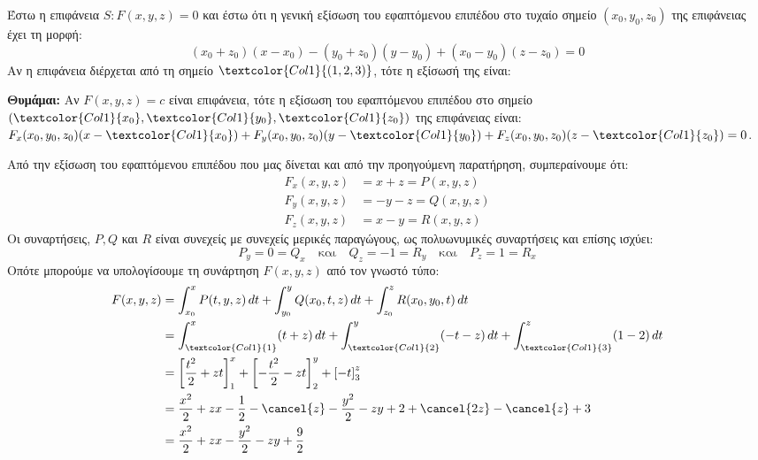 \documentclass[a4paper,table]{report}
\begin{document}
\begin{mybox3}
  \begin{thema}
    Έστω η επιφάνεια $ S \colon F(x,y,z)=0 $ και έστω ότι η γενική εξίσωση του 
    εφαπτόμενου επιπέδου στο τυχαίο σημείο $ (x_{0}, y_{0}, z_{0}) $ της επιφάνειας έχει 
    τη μορφή:
    \[
      (x_{0}+ z_{0})(x- x_{0}) - (y_{0}+ z_{0})(y- y_{0}) + (x_{0}- y_{0})(z- z_{0})=0 
    \] 
    Αν η επιφάνεια διέρχεται από τη σημείο $ \textcolor{Col1}{(1,2,3)} $, τότε η εξίσωσή 
    της είναι:
  \end{thema}
\end{mybox3}
\begin{solution}
  \item []
    \begin{mybox1}
      \vspace{0.5\baselineskip}
      \textcolor{Col1}{\textbf{Θυμάμαι:}} 
      Αν $ F(x,y,z)=c $ είναι επιφάνεια, τότε η εξίσωση του εφαπτόμενου επιπέδου 
      στο σημείο $ (\textcolor{Col1}{x_{0}},
      \textcolor{Col1}{y_{0}}, \textcolor{Col1}{z_{0}}) $ της επιφάνειας είναι: 
      $ {F_{x}(x_{0}, y_{0}, z_{0})}(x- \textcolor{Col1}{x_{0}}) +
      {F_{y}(x_{0}, y_{0}, z_{0})}(y- \textcolor{Col1}{y_{0}}) + 
      {F_{z}(x_{0}, y_{0}, z_{0})}(z- \textcolor{Col1}{z_{0}}) = 0 $.
    \end{mybox1}
    Από την εξίσωση του εφαπτόμενου επιπέδου που μας δίνεται και από την προηγούμενη
    παρατήρηση, συμπεραίνουμε ότι:
    \begin{align*}
      F_{x}(x,y,z) &= x+z = P(x,y,z) \\
      F_{y}(x,y,z) &= -y-z = Q(x,y,z) \\
      F_{z}(x,y,z) &= x-y = R(x,y,z)
    \end{align*} 
    Οι συναρτήσεις, $ P,Q $ και $ R $ είναι συνεχείς με συνεχείς μερικές παραγώγους, ως
    πολυωνυμικές συναρτήσεις και επίσης ισχύει:
    \[
      P_{y} = 0 = Q_{x} \quad \text{και} \quad Q_{z}=-1=R_{y} \quad \text{και} \quad
      P_{z} = 1 = R_{x}
     \] 
    Οπότε μπορούμε να υπολογίσουμε τη συνάρτηση $ F(x,y,z) $ από τον γνωστό τύπο:
    \begin{align*}
      F(x,y,z) &= \int _{x_{0}}^{x} P(t,y,z) \,{dt} + \int _{y_{0}}^{y} Q(x_{0},t,z) 
      \,{dt} + \int _{z_{0}}^{z} R(x_{0}, y_{0}, t) \,{dt} \\
               &= \int _{\textcolor{Col1}{1}}^{x} (t+z) \,{dt} + \int
               _{\textcolor{Col1}{2}}^{y} (-t-z) \,{dt} + 
               \int _{\textcolor{Col1}{3}}^{z} (1-2) \,{dt} \\
               &= \left[\frac{t^2}{2} + zt\right]_{1}^{x} + \left[- \frac{t^2}{2} -zt\right]_{2}^{y} +
               \left[-t\right]_{3}^{z} \\
               &= \frac{x^{2}}{2} + zx - \frac{1}{2} -\cancel{z} - \frac{y^{2}}{2} - zy +
               2 + \cancel{2z}
               -\cancel{z} +3 \\
               &= \frac{x^{2}}{2} +zx - \frac{y^{2}}{2} - zy + \frac{9}{2}
    \end{align*} 
  \end{solution}
\end{document}
